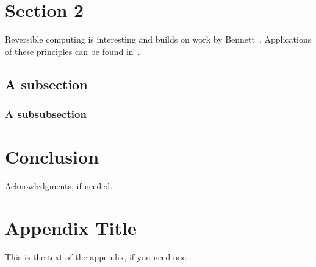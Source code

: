 \documentclass[10pt]{sigplanconf}
\begin{document}
\section{Section 2}
Reversible computing is interesting and builds on work by Bennett~\cite{Bennett:1982}. Applications of these principles can be found in~\cite{ThomsenAxelsen:2009:PPL,YokoyamaGlueck:2007:Janus}.

\subsection{A subsection}


\subsubsection{A subsubsection}


\section{Conclusion}




\acks
Acknowledgments, if needed.






\appendix
\section{Appendix Title}

This is the text of the appendix, if you need one.
\end{document}
